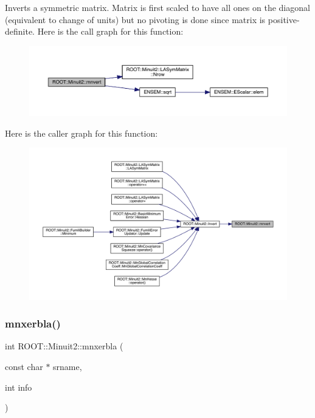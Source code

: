 Inverts a symmetric matrix. Matrix is first scaled to have all ones on the diagonal (equivalent to change of units) but no pivoting is done since matrix is positive-\/definite. Here is the call graph for this function\+:
\nopagebreak
\begin{figure}[H]
\begin{center}
\leavevmode
\includegraphics[width=350pt]{d6/d3a/namespaceROOT_1_1Minuit2_a5e64c8eae56aaee62f3b683068e1148a_cgraph}
\end{center}
\end{figure}
Here is the caller graph for this function\+:
\nopagebreak
\begin{figure}[H]
\begin{center}
\leavevmode
\includegraphics[width=350pt]{d6/d3a/namespaceROOT_1_1Minuit2_a5e64c8eae56aaee62f3b683068e1148a_icgraph}
\end{center}
\end{figure}
\mbox{\label{namespaceROOT_1_1Minuit2_a6c2d97c42f0b3f75b7370ae5e6f2c638}} 
\subsubsection{\texorpdfstring{mnxerbla()}{mnxerbla()}}
{\footnotesize\ttfamily int R\+O\+O\+T\+::\+Minuit2\+::mnxerbla (\begin{DoxyParamCaption}\item[{const char $\ast$}]{srname,  }\item[{int}]{info }\end{DoxyParamCaption})}

